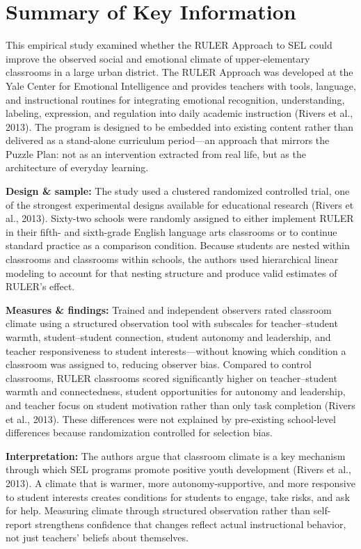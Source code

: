 \documentclass[11pt]{article}
\begin{document}
\section{Summary of Key Information}

This empirical study examined whether the RULER Approach to SEL could improve the observed social and emotional climate of upper-elementary classrooms in a large urban district. The RULER Approach was developed at the Yale Center for Emotional Intelligence and provides teachers with tools, language, and instructional routines for integrating emotional recognition, understanding, labeling, expression, and regulation into daily academic instruction (Rivers et al., 2013). The program is designed to be embedded into existing content rather than delivered as a stand-alone curriculum period---an approach that mirrors the Puzzle Plan: not as an intervention extracted from real life, but as the architecture of everyday learning.

\textbf{Design \& sample:} The study used a clustered randomized controlled trial, one of the strongest experimental designs available for educational research (Rivers et al., 2013). Sixty-two schools were randomly assigned to either implement RULER in their fifth- and sixth-grade English language arts classrooms or to continue standard practice as a comparison condition. Because students are nested within classrooms and classrooms within schools, the authors used hierarchical linear modeling to account for that nesting structure and produce valid estimates of RULER's effect.

\textbf{Measures \& findings:} Trained and independent observers rated classroom climate using a structured observation tool with subscales for teacher--student warmth, student--student connection, student autonomy and leadership, and teacher responsiveness to student interests---without knowing which condition a classroom was assigned to, reducing observer bias. Compared to control classrooms, RULER classrooms scored significantly higher on teacher--student warmth and connectedness, student opportunities for autonomy and leadership, and teacher focus on student motivation rather than only task completion (Rivers et al., 2013). These differences were not explained by pre-existing school-level differences because randomization controlled for selection bias.

\textbf{Interpretation:} The authors argue that classroom climate is a key mechanism through which SEL programs promote positive youth development (Rivers et al., 2013). A climate that is warmer, more autonomy-supportive, and more responsive to student interests creates conditions for students to engage, take risks, and ask for help. Measuring climate through structured observation rather than self-report strengthens confidence that changes reflect actual instructional behavior, not just teachers' beliefs about themselves.
\end{document}
